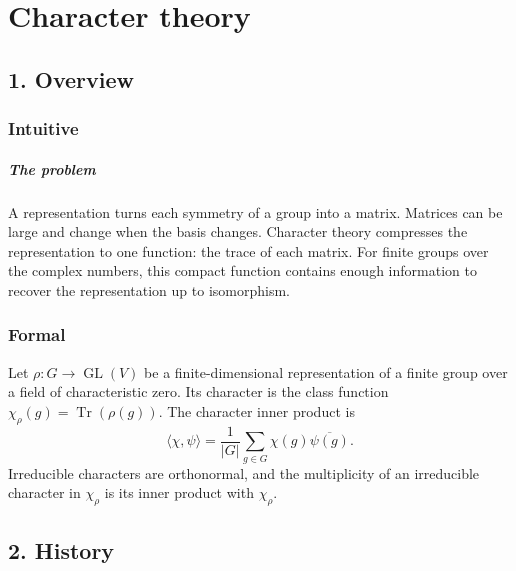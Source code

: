 \clearpage\chapter{Character theory}
\section*{1. Overview}
\subsection*{Intuitive}
\paragraph{The problem}

A representation turns each symmetry of a group into a matrix. Matrices can be large and change when the basis changes. Character theory compresses the representation to one function: the trace of each matrix. For finite groups over the complex numbers, this compact function contains enough information to recover the representation up to isomorphism.



\subsection*{Formal}
Let $\rho:G\to\operatorname{GL}(V)$ be a finite-dimensional representation of a finite group over a field of characteristic zero. Its character is the class function $\chi_\rho(g)=\operatorname{Tr}(\rho(g))$. The character inner product is
\[
\langle\chi,\psi\rangle=\frac1{|G|}\sum_{g\in G}\chi(g)\overline{\psi(g)}.
\]
Irreducible characters are orthonormal, and the multiplicity of an irreducible character in $\chi_\rho$ is its inner product with $\chi_\rho$.
\section*{2. History}
